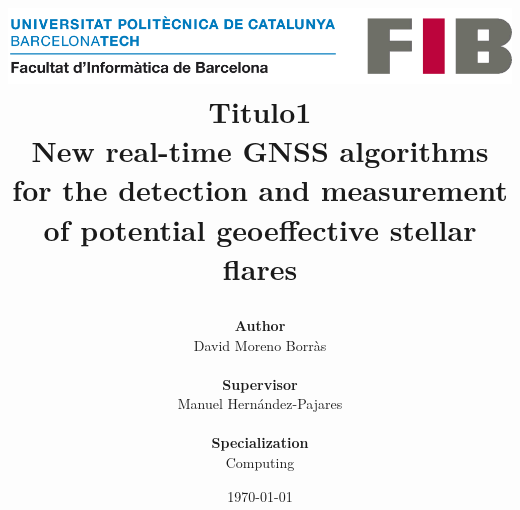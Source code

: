 \title{
	{
	\includegraphics[width=0.7\linewidth]{images/cover/logo-fib.png}	
	\vspace{1cm} \\
	\textbf{Titulo1} \\
	\large New real-time GNSS algorithms for the detection and measurement of potential geoeffective stellar flares}
\author{\textbf{Author}\\
	David Moreno Borr\`as
	\\ \\
	\textbf{Supervisor}\\
	Manuel Hernández-Pajares
	\\ \\
	\textbf{Specialization}\\
	Computing
} 
	\vspace{1.3cm}
\date{\today}
}
\maketitle
\thispagestyle{empty}